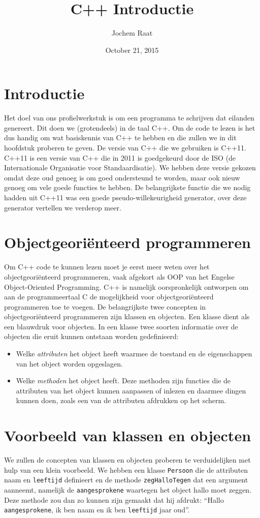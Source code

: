 \documentclass{article}
\title{C++ Introductie}
\author{Jochem Raat}
\date{October 21, 2015}
\begin{document}
\maketitle
\newpage

\tableofcontents
\newpage

\section{Introductie}
Het doel van ons profielwerkstuk is om een programma te schrijven dat eilanden genereert. Dit doen we (grotendeels) in de taal C++. Om de code te lezen is het dus handig om wat basiskennis van C++ te hebben en die zullen we in dit hoofdstuk proberen te geven. De versie van C++ die we gebruiken is C++11. C++11 is een versie van C++ die in 2011 is goedgekeurd door de ISO (de Internationale Organisatie voor Standaardisatie). We hebben deze versie gekozen omdat deze oud genoeg is om goed ondersteund te worden, maar ook nieuw genoeg om vele goede functies te hebben. De belangrijkste functie die we nodig hadden uit C++11 was een goede pseudo-willekeurigheid generator, over deze generator vertellen we verderop meer.

\section{Objectgeoriënteerd programmeren}
Om C++ code te kunnen lezen moet je eerst meer weten over het objectgeoriënteerd programmeren, vaak afgekort als OOP van het Engelse Object-Oriented Programming. C++ is namelijk oorspronkelijk ontworpen om aan de programmeertaal C de mogelijkheid voor objectgeoriënteerd programmeren toe te voegen.  De belangrijkste twee concepten in objectgeoriënteerd programmeren zijn klassen en objecten. Een klasse dient als een blauwdruk voor objecten. In een klasse twee soorten informatie over de objecten die eruit kunnen ontstaan worden gedefinieerd:

\begin{itemize}
  \item Welke \textit{attributen} het object heeft waarmee de toestand en de eigenschappen van het object worden opgeslagen.
  \item Welke \textit{methoden} het object heeft. Deze methoden zijn functies die de attributen van het object kunnen aanpassen of inlezen en daarmee dingen kunnen doen, zoals een van de attributen afdrukken op het scherm.
\end{itemize}

\section{Voorbeeld van klassen en objecten}
We zullen de concepten van klassen en objecten proberen te verduidelijken met hulp van een klein voorbeeld. We hebben een klasse \texttt{Persoon} die de attributen naam en \texttt{leeftijd} definieert en de methode \texttt{zegHalloTegen} dat een argument aanneemt, namelijk de \texttt{aangesprokene} waartegen het object hallo moet zeggen. Deze methode zou dan zo kunnen zijn gemaakt dat hij afdrukt: “Hallo \texttt{aangesprokene}, ik ben naam en ik ben \texttt{leeftijd} jaar oud”.
\end{document}
